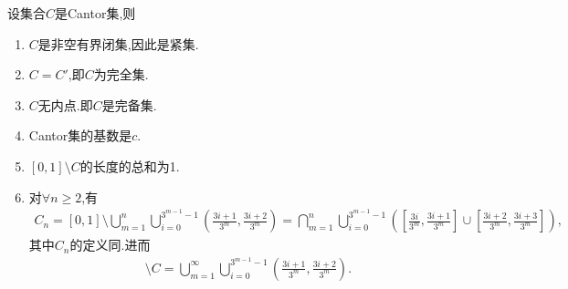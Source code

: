 \documentclass[../../main.tex]{subfiles}%
\begin{document}
\begin{theorem}[Cantor集的基本性质]\label{theorem:Cantor集的基本性质}
设集合$C$是Cantor集,则
\begin{enumerate}[(1)]
\item $C$是非空有界闭集,因此是紧集.

\item $C = C'$,即$C$为完全集.

\item $C$无内点.即$C$是完备集.

\item Cantor集的基数是$c$.

\item $[0,1]\setminus C$的长度的总和为1.

\item 对$\forall n\geqslant 2$,有
\begin{align*}
C_n = [0,1] \setminus \bigcup\limits_{m=1}^n \bigcup\limits_{i=0}^{3^{m-1}-1} \left( \frac{3i+1}{3^m}, \frac{3i+2}{3^m} \right) = \bigcap\limits_{m=1}^n \bigcup\limits_{i=0}^{3^{m-1}-1} \left( \left[ \frac{3i}{3^m}, \frac{3i+1}{3^m} \right] \cup \left[ \frac{3i+2}{3^m}, \frac{3i+3}{3^m} \right] \right),
\end{align*}
其中$C_n$的定义同.进而
\begin{align*}
[0,1]\setminus C=\bigcup_{m=1}^{\infty}{\bigcup_{i=0}^{3^{m-1}-1}{\left( \frac{3i+1}{3^m},\frac{3i+2}{3^m} \right)}}.
\end{align*}
\end{enumerate}
\end{theorem}
\end{document}
